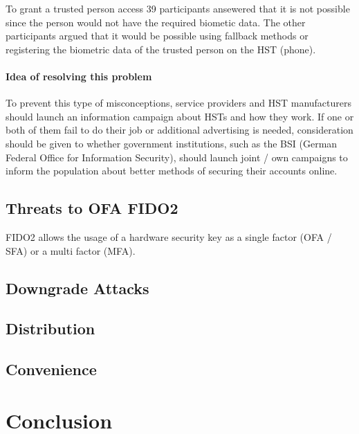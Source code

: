 \documentclass[runningheads]{llncs}
\begin{document}
To grant a trusted person access 39 participants ansewered that it is not possible since the person would not have the required biometic data. The other participants argued that it would be possible using fallback methods or registering the biometric data of the trusted person on the HST (phone).

\paragraph{Idea of resolving this problem}
To prevent this type of misconceptions, service providers and HST manufacturers should launch an information campaign about HSTs and how they work. 
If one or both of them fail to do their job or additional advertising is needed, consideration should be given to whether government institutions, such as the BSI (German Federal Office for Information Security), should launch joint / own campaigns to inform the population about better methods of securing their accounts online.

\subsection{Threats to OFA FIDO2}
FIDO2 allows the usage of a hardware security key as a single factor (OFA / SFA) or a multi factor (MFA).

\subsection{Downgrade Attacks}

\subsection{Distribution}

\subsection{Convenience}

\section{Conclusion}



\end{document}
